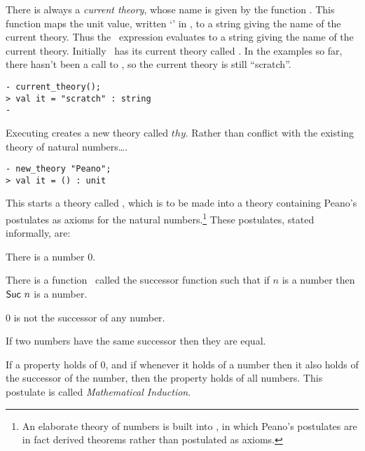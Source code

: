 There is always a {\it current theory\/}, whose name is given by the
function .  This function maps the unit value,
written `\ml{()}' in \ML, to a string giving the name of the current
theory.  Thus the \ML\ expression  evaluates to
a string giving the name of the current theory.  Initially \HOL\ has
its current theory called .  In the examples so far, there
hasn't been a call to , so the current theory is still
``scratch''.

\begin{session}\begin{verbatim}
- current_theory();
> val it = "scratch" : string
-
\end{verbatim}\end{session}

    Executing  creates a new theory called
    $thy$.  Rather than conflict with the existing theory of natural
    numbers\dots.

\begin{session}\begin{verbatim}
- new_theory "Peano";
> val it = () : unit
\end{verbatim}\end{session}

\noindent
This starts a theory called , which is to be made into a
theory containing Peano's postulates as axioms for the natural
numbers.\footnote{An elaborate theory of numbers is built into \HOL,
  in which Peano's postulates are in fact derived theorems rather than
  postulated as axioms.}  These postulates, stated informally, are:

\begin{list}{{\small\bf P}}{
\setlength{\leftmargin}{12mm}
\setlength{\rightmargin}{7mm}
\setlength{\labelwidth}{6mm}
\setlength{\labelsep}{2mm}
\setlength{\listparindent}{0mm}
\setlength{\itemsep}{14pt plus1pt minus1pt}
\setlength{\topsep}{3mm}
\setlength{\parsep}{0mm}}

\item There is a number $0$.
\item There is a function \Suc\ called the successor function such that
if $n$ is a number then ${\sf Suc} \ n$ is a number.
\item $0$ is not the successor of any number.
\item If two numbers have the same successor then they are equal.
\item If a property holds of $0$, and if whenever it holds of a number then it
also holds of the successor of the number, then the property holds of all
numbers. This postulate is called {\it Mathematical Induction}.
\end{list}

